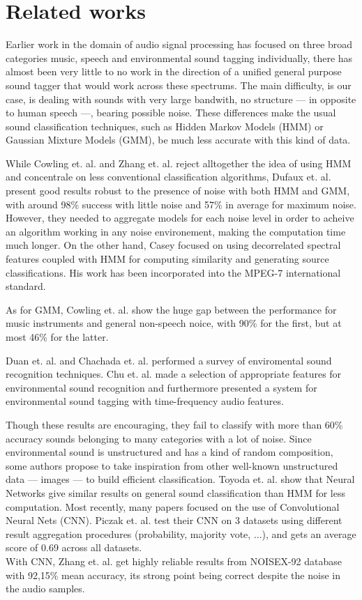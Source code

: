 \documentclass{article} %
\begin{document}
\section{Related works}
 	Earlier work in the domain of audio signal processing has focused on three broad categories music, speech and environmental sound tagging individually, there has almost been very little to no work in the direction of a unified general purpose sound tagger that would work across these spectrums.
    The main difficulty, is our case, is dealing with sounds with very large bandwith, no structure --- in opposite to human speech ---, bearing possible noise. These differences make the usual sound classification techniques, such as Hidden Markov Models (HMM) or Gaussian Mixture Models (GMM), be much less accurate with this kind of data.


    While Cowling et. al. \cite{Cowling} and Zhang et. al. \cite{Zhang} reject alltogether the idea of using HMM and concentrale on less conventional classification algorithms, Dufaux et. al. \cite{Dufaux} present good results robust to the presence of noise with both HMM and GMM, with around 98\% success with little noise and 57\% in average for maximum noise. However, they needed to aggregate models for each noise level in order to acheive an algorithm working in any noise environement, making the computation time much longer. On the other hand, Casey \cite{Casey} focused on using decorrelated spectral features coupled with HMM for computing similarity and generating source classifications. His work has been incorporated into the MPEG-7 international standard. 

    As for GMM, Cowling et. al. \cite{Cowling} show the huge gap between the performance for music instruments and general non-speech noice, with 90\% for the first, but at most 46\% for the latter.
    
    Duan et. al. \cite{Duan} and Chachada et. al. \cite{Chachada} performed a survey of enviromental sound recognition techniques. Chu et. al. \cite{Chu1} made a selection of appropriate features for environmental sound recognition and furthermore presented \cite{Chu2} a system for environmental sound tagging with time-frequency audio features.

    Though these results are encouraging, they fail to classify with more than 60\% accuracy sounds belonging to many categories with a lot of noise.
    Since environmental sound is unstructured and has a kind of random composition, some authors propose to take inspiration from other well-known unstructured data --- images --- to build efficient classification. 
    Toyoda et. al. \cite{Toyoda} show that Neural Networks give similar results on general sound classification than HMM for less computation.
    Most recently, many papers focused on the use of Convolutional Neural Nets (CNN). Piczak et. al. \cite{Piczak} test their CNN on 3 datasets using different result aggregation procedures (probability, majority vote, ...), and gets an average score of 0.69 across all datasets.\\
    With CNN, Zhang et. al. \cite{Zhang} get highly reliable results from NOISEX-92 database with 92,15\% mean accuracy, its strong point being correct despite the noise in the audio samples.
\end{document}
